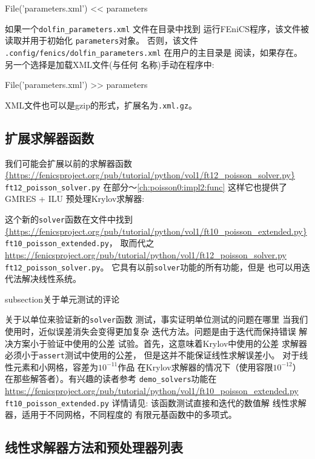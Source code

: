 \begin{python}
File('parameters.xml') << parameters
\end{python}
如果一个\verb!dolfin_parameters.xml! 文件在目录中找到
运行FEniCS程序，该文件被读取并用于初始化
\texttt{parameters}对象。 否则，该文件
\verb!.config/fenics/dolfin_parameters.xml!
在用户的主目录是
阅读，如果存在。 另一个选择是加载XML文件(与任何
名称)手动在程序中:

\begin{python}
File('parameters.xml') >> parameters
\end{python}
XML文件也可以是gzip的形式，扩展名为\texttt{.xml.gz}。

\subsection{扩展求解器函数}

我们可能会扩展以前的求解器函数
\url{{https://fenicsproject.org/pub/tutorial/python/vol1/ft12_poisson_solver.py}} {\nolinkurl{ft12_poisson_solver.py}}
在部分〜\ref{ch:poisson0:impl2:func}
这样它也提供了GMRES + ILU
预处理Krylov求解器:


这个新的\texttt{solver}函数在文件中找到
\url{{https://fenicsproject.org/pub/tutorial/python/vol1/ft10_poisson_extended.py}} {\nolinkurl{ft10_poisson_extended.py}}，
取而代之
\url{https://fenicsproject.org/pub/tutorial/python/vol1/ft12_poisson_solver.py} {\nolinkurl{ft12_poisson_solver.py}}。
它具有以前\texttt{solver}功能的所有功能，但是
也可以用迭代法解决线性系统。

subsection{关于单元测试的评论}

关于以单位来验证新的\texttt{solver}函数
测试，事实证明单位测试的问题在哪里
当我们使用时，近似误差消失会变得更加复杂
迭代方法。问题是由于迭代而保持错误
解决方案小于验证中使用的公差
试验。首先，这意味着Krylov中使用的公差
求解器必须小于\texttt{assert}测试中使用的公差，
但是这并不能保证线性求解误差小。
对于线性元素和小网格，容差为$10^{-11}$作品
在Krylov求解器的情况下（使用容限$10^{-12}$）
在那些解答者）。有兴趣的读者参考
\verb!demo_solvers!功能在
\url{https://fenicsproject.org/pub/tutorial/python/vol1/ft10_poisson_extended.py} {\nolinkurl{ft10_poisson_extended.py}}
详情请见:
该函数测试直接和迭代的数值解
线性求解器，适用于不同网格，不同程度的
有限元基函数中的多项式。

\subsection{线性求解器方法和预处理器列表}
\label{ftut:app:solver:prec}

